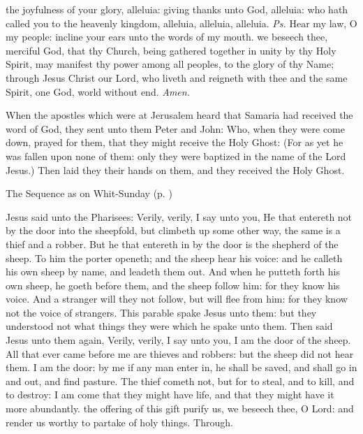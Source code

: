 \introit
{} the joyfulness of your glory, alleluia: giving thanks unto God, alleluia: who hath called you to the heavenly kingdom, alleluia, alleluia, alleluia. \textit{Ps.} Hear my law, O my people: incline your ears unto the words of my mouth.
\collect
{} we beseech thee, merciful God, that thy Church, being gathered together in unity by thy Holy Spirit, may manifest thy power among all peoples, to the glory of thy Name; through Jesus Christ our Lord, who liveth and reigneth with thee and the same Spirit, one God, world without end. \textit{Amen.}

 When the apostles which were at Jerusalem heard that Samaria had received the word of God, they sent unto them Peter and John: Who, when they were come down, prayed for them, that they might receive the Holy Ghost: (For as yet he was fallen upon none of them: only they were baptized in the name of the Lord Jesus.) Then laid they their hands on them, and they received the Holy Ghost.
\begin{rubric}
{The Sequence as on Whit-Sunday (p. \pageref{WhitSeq})}
\end{rubric}
 Jesus said unto the Pharisees: Verily, verily, I say unto you, He that entereth not by the door into the sheepfold, but climbeth up some other way, the same is a thief and a robber. But he that entereth in by the door is the shepherd of the sheep. To him the porter openeth; and the sheep hear his voice: and he calleth his own sheep by name, and leadeth them out. And when he putteth forth his own sheep, he goeth before them, and the sheep follow him: for they know his voice. And a stranger will they not follow, but will flee from him: for they know not the voice of strangers. This parable spake Jesus unto them: but they understood not what things they were which he spake unto them. Then said Jesus unto them again, Verily, verily, I say unto you, I am the door of the sheep. All that ever came before me are thieves and robbers: but the sheep did not hear them. I am the door: by me if any man enter in, he shall be saved, and shall go in and out, and find pasture. The thief cometh not, but for to steal, and to kill, and to destroy: I am come that they might have life, and that they might have it more abundantly.
\secret
{} the offering of this gift purify us, we beseech thee, O Lord: and render us worthy to partake of holy things. Through.\\

